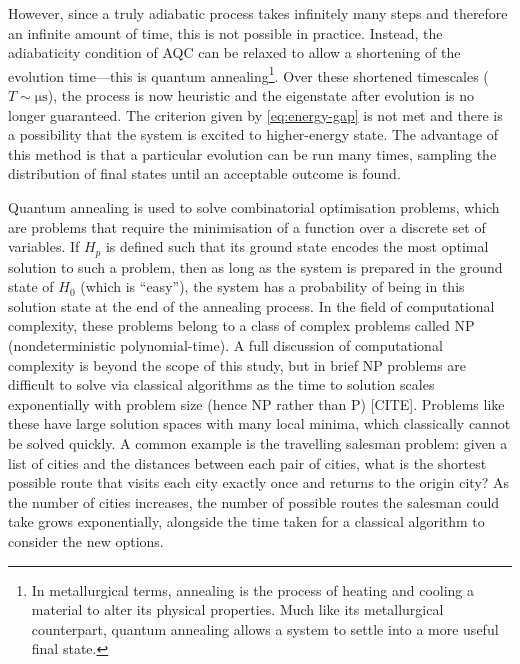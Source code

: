 \documentclass[12pt]{article}
\theoremstyle{definition}
\begin{document}
However, since a truly adiabatic process takes infinitely many steps and therefore an infinite amount of time, this is not possible in practice. Instead, the adiabaticity condition of AQC can be relaxed to allow a shortening of the evolution time---this is quantum annealing\footnote{In metallurgical terms, annealing is the process of heating and cooling a material to alter its physical properties. Much like its metallurgical counterpart, quantum annealing allows a system to settle into a more useful final state.}. Over these shortened timescales ($T\sim\unit{\us}$), the process is now heuristic and the eigenstate after evolution is no longer guaranteed. The criterion given by \cref{eq:energy-gap} is not met and there is a possibility that the system is excited to higher-energy state. The advantage of this method is that a particular evolution can be run many times, sampling the distribution of final states until an acceptable outcome is found.

Quantum annealing is used to solve combinatorial optimisation problems, which are problems that require the minimisation of a function over a discrete set of variables. If $H_p$ is defined such that its ground state encodes the most optimal solution to such a problem, then as long as the system is prepared in the ground state of $H_0$ (which is ``easy''), the system has a probability of being in this solution state at the end of the annealing process. In the field of computational complexity, these problems belong to a class of complex problems called NP (nondeterministic polynomial-time). A full discussion of computational complexity is beyond the scope of this study, but in brief NP problems are difficult to solve via classical algorithms as the time to solution scales exponentially with problem size (hence NP rather than P) [CITE]. Problems like these have large solution spaces with many local minima, which classically cannot be solved quickly. A common example is the travelling salesman problem: given a list of cities and the distances between each pair of cities, what is the shortest possible route that visits each city exactly once and returns to the origin city? As the number of cities increases, the number of possible routes the salesman could take grows exponentially, alongside the time taken for a classical algorithm to consider the new options.
\end{document}
